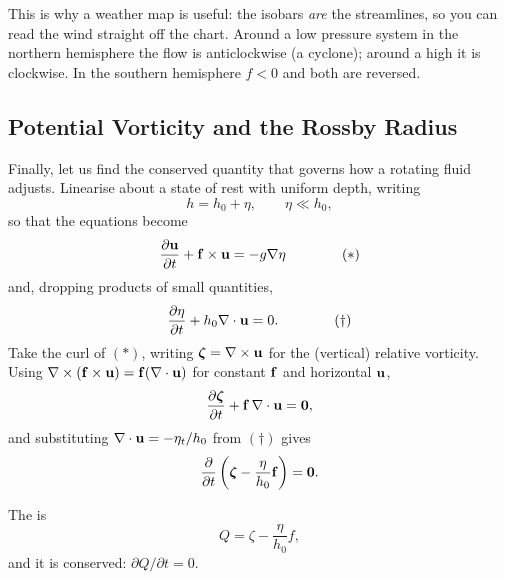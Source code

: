 \documentclass[a4paper]{scrartcl}
\newcommand{\pd}[2]{\frac{\partial #1}{\partial #2}}
\newcommand{\bze}{\boldsymbol{\zeta}}
\begin{document}
\begin{center}
\end{center}

This is why a weather map is useful: the isobars \emph{are} the streamlines, so you can read the wind straight off the chart. Around a low pressure system in the northern hemisphere the flow is anticlockwise (a cyclone); around a high it is clockwise. In the southern hemisphere $f < 0$ and both are reversed.

\subsection{Potential Vorticity and the Rossby Radius}

Finally, let us find the conserved quantity that governs how a rotating fluid adjusts. Linearise about a state of rest with uniform depth, writing
$$
h = h_0 + \eta, \qquad \eta \ll h_0,
$$
so that the equations become
$$
\pd{\vv u}{t} + \vv f\times\vv u = -g\nabla\eta \qquad\qquad (*)
$$
and, dropping products of small quantities,
$$
\pd{\eta}{t} + h_0 \nabla\cdot\vv u = 0. \qquad\qquad (\dagger)
$$
Take the curl of $(*)$, writing $\bze = \nabla\times\vv u$ for the (vertical) relative vorticity. Using $\nabla\times(\mathbf{f} \times \mathbf{u}) = \mathbf{f}(\nabla\cdot\mathbf{u})$ for constant $\mathbf{f}$ and horizontal $\mathbf{u}$,
$$
\pd{\bze}{t} + \vv f \, \nabla\cdot\vv u = \vv 0,
$$
and substituting $\nabla\cdot\mathbf{u} = -\eta_t/h_0$ from $(\dagger)$ gives
$$
\pd{}{t}\left(\bze - \frac{\eta}{h_0}\vv f\right) = \vv 0.
$$

\begin{definition}
	The  is
	$$
	Q = \zeta - \frac{\eta}{h_0}f,
	$$
	and it is conserved: $\partial Q/\partial t = 0$.
\end{definition}
\end{document}
